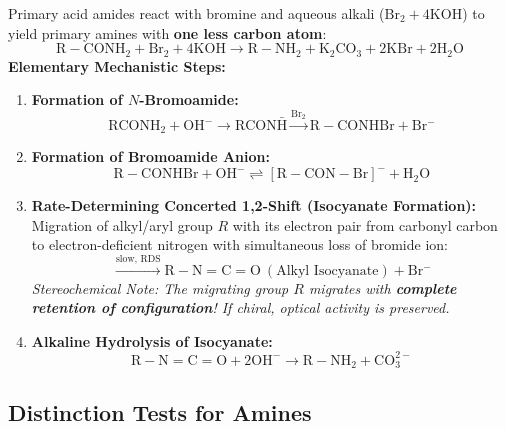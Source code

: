 \documentclass[10pt,twoside,openright]{book}
\begin{document}
\begin{formulabox}
Primary acid amides react with bromine and aqueous alkali ($\mathrm{Br_2 + 4KOH}$) to yield primary amines with \textbf{one less carbon atom}:
\begin{equation}
  \mathrm{R-CONH_2} + \mathrm{Br_2} + 4\mathrm{KOH} \longrightarrow \mathbf{\mathrm{R-NH_2}} + \mathrm{K_2CO_3} + 2\mathrm{KBr} + 2\mathrm{H_2O}
\end{equation}
\textbf{Elementary Mechanistic Steps:}
\begin{enumerate}[leftmargin=*]
  \item \textbf{Formation of $N$-Bromoamide:}
  \begin{equation*}
    \mathrm{RCONH_2} + \mathrm{OH^-} \to \mathrm{RCON\bar{H}} \xrightarrow{\mathrm{Br_2}} \mathrm{R-CONHBr} + \mathrm{Br^-}
  \end{equation*}
  \item \textbf{Formation of Bromoamide Anion:}
  \begin{equation*}
    \mathrm{R-CONHBr} + \mathrm{OH^-} \rightleftharpoons [\mathrm{R-CON-Br}]^- + \mathrm{H_2O}
  \end{equation*}
  \item \textbf{Rate-Determining Concerted 1,2-Shift (Isocyanate Formation):}
  Migration of alkyl/aryl group $R$ with its electron pair from carbonyl carbon to electron-deficient nitrogen with simultaneous loss of bromide ion:
  \begin{equation}
    [\mathrm{R-CO-\bar{N}-Br}] \xrightarrow{\text{slow, RDS}} \mathbf{\mathrm{R-N=C=O}} \ (\text{Alkyl Isocyanate}) + \mathrm{Br^-}
  \end{equation}
  \textit{Stereochemical Note: The migrating group $R$ migrates with \textbf{complete retention of configuration}! If chiral, optical activity is preserved.}
  \item \textbf{Alkaline Hydrolysis of Isocyanate:}
  \begin{equation}
    \mathrm{R-N=C=O} + 2\mathrm{OH^-} \longrightarrow \mathbf{\mathrm{R-NH_2}} + \mathrm{CO_3^{2-}}
  \end{equation}
\end{enumerate}
\end{formulabox}

\subsection{Distinction Tests for Amines}
\end{document}
